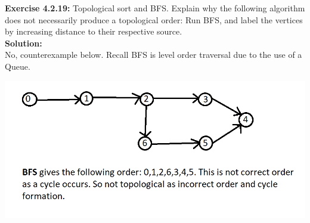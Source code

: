 \documentclass[11pt,fleqn]{article}
\begin{document}
\textbf{Exercise 4.2.19:} Topological sort and BFS. Explain why the following algorithm does not necessarily
produce a topological order: Run BFS, and label the vertices by increasing distance
to their respective source.\\

\textbf{Solution:}\\
No, counterexample below. Recall BFS is level order traversal due to the use of a Queue.

\begin{center}
	\includegraphics[scale=.6]{4.2.19.png}
\end{center}


	
\end{document}
